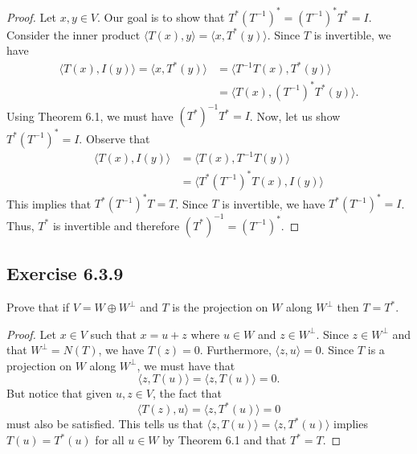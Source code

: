 \begin{proof}
Let \( x,y \in V  \). Our goal is to show that \( T^{*} (T^{-1})^{*} =  (T^{-1})^{*} T^{*} = I  \). Consider the inner product \( \langle T(x) , y \rangle = \langle x  , T^{*}(y) \rangle \). Since \( T  \) is invertible, we have
\begin{align*}
    \langle T(x) , I(y) \rangle = \langle x , T^{*}(y) \rangle &= \langle T^{-1}T(x) , T^{*}(y) \rangle \\
                                 &= \langle T(x) , (T^{-1})^{*} T^{*}(y) \rangle.
\end{align*}
Using Theorem 6.1, we must have \( (T^{*})^{-1} T^{*} = I   \). Now, let us show \( T^{*} (T^{-1})^{*} = I  \). Observe that
\begin{align*}
    \langle T(x) , I(y) \rangle &= \langle T(x) , T^{-1} T(y) \rangle \\
                                &= \langle   T^{*} (T^{-1})^{*} T (x) , I(y) \rangle 
\end{align*}
This implies that \(   T^{*} (T^{-1})^{*} T  = T \). Since \( T  \) is invertible, we have \( T^{*} (T^{-1})^{*} = I  \). Thus, \( T^{*}  \) is invertible and therefore \( (T^{*})^{-1} = (T^{-1})^{*} \).
\end{proof}

\subsection*{Exercise 6.3.9} Prove that if \( V = W \oplus W^{\perp} \) and \( T  \) is the projection on \( W  \) along \( W^{\perp} \) then \( T = T^{*} \).  
\begin{proof}
Let \( x \in V  \) such that \( x = u + z  \) where \( u \in W  \) and \( z \in W^{\perp} \). Since \( z \in W^{\perp} \) and that \( W^{\perp} = N(T) \), we have \( T(z) = 0  \). Furthermore, \( \langle z , u \rangle = 0  \). Since \( T  \) is a projection on \( W  \) along \( W^{\perp} \), we must have that 
\[  \langle z , T(u) \rangle = \langle z , T(u)  \rangle = 0.  \]
But notice that given \( u,z \in V  \), the fact that
\[ \langle T(z)  , u  \rangle = \langle z  ,  T^{*}(u) \rangle = 0   \]
must also be satisfied. This tells us that \( \langle z , T(u) \rangle = \langle z  , T^{*}(u) \rangle \) implies \( T(u) = T^{*}(u) \) for all \( u \in W  \) by Theorem 6.1 and that \( T^{*} = T  \).
\end{proof}

